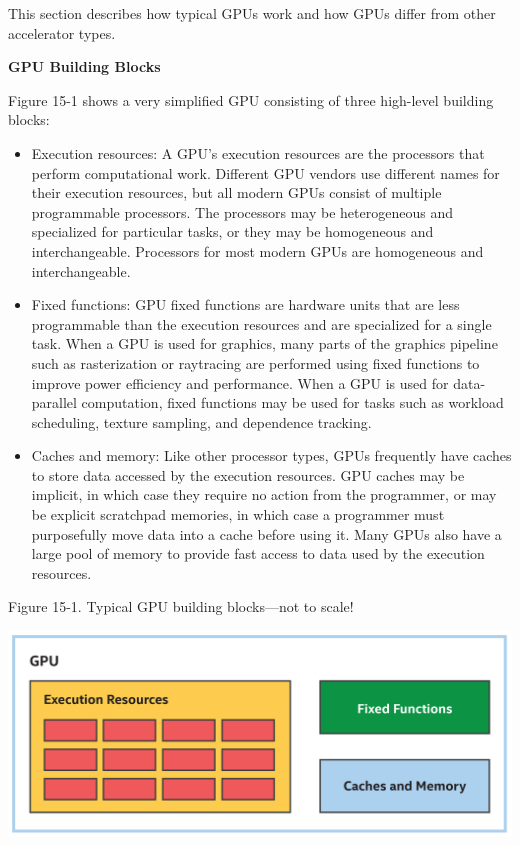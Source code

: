 This section describes how typical GPUs work and how GPUs differ from other accelerator types.\par

\hspace*{\fill} \par %
\textbf{GPU Building Blocks}

Figure 15-1 shows a very simplified GPU consisting of three high-level building blocks:\par

\begin{itemize}
	\item Execution resources: A GPU’s execution resources are the processors that perform computational work. Different GPU vendors use different names for their execution resources, but all modern GPUs consist of multiple programmable processors. The processors may be heterogeneous and specialized for particular tasks, or they may be homogeneous and interchangeable. Processors for most modern GPUs are homogeneous and interchangeable.
	\item Fixed functions: GPU fixed functions are hardware units that are less programmable than the execution resources and are specialized for a single task. 
	When a GPU is used for graphics, many parts of the graphics pipeline such as rasterization or raytracing are performed using fixed functions to improve 
	power efficiency and performance. When a GPU is used for data-parallel computation, fixed functions may be used for tasks such as workload scheduling, 
	texture sampling, and dependence tracking.
	\item Caches and memory: Like other processor types, GPUs frequently have caches to store data accessed by the execution resources. GPU caches may be 
	implicit, in which case they require no action from the programmer, or may be explicit scratchpad memories, in which case a programmer must purposefully move data into a cache before using it. Many GPUs also have a large pool of memory to provide fast access to data used by the execution 
	resources.
\end{itemize}

\hspace*{\fill} \par %
Figure 15-1. Typical GPU building blocks—not to scale!
\begin{center}
	\includegraphics[width=1.0\textwidth]{content/chapter-15/images/2}
\end{center}

